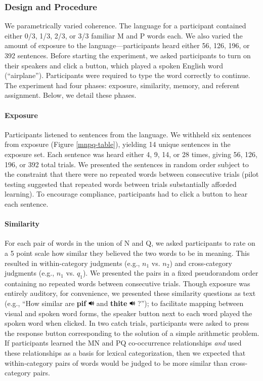 \documentclass[man,floatsintext]{apa6}
\begin{document}
\subsubsection{Design and Procedure}

We parametrically varied coherence. The language for a participant contained either 0/3, 1/3, 2/3, or 3/3 familiar M and P words each. We also varied the amount of exposure to the language---participants heard either 56, 126, 196, or 392 sentences. Before starting the experiment, we asked participants to turn on their speakers and click a button, which played a spoken English word (``airplane''). Participants were required to type the word correctly to continue. The experiment had four phases: exposure, similarity, memory, and referent assignment. Below, we detail these phases.

\paragraph{Exposure}
Participants listened to sentences from the language. We withheld six sentences from exposure (Figure \ref{mnpq-table}), yielding 14 unique sentences in the exposure set. Each sentence was heard either 4, 9, 14, or 28 times, giving 56, 126, 196, or 392 total trials. We presented the sentences in random order subject to the constraint that there were no repeated words between consecutive trials (pilot testing suggested that repeated words between trials substantially afforded learning). To encourage compliance, participants had to click a button to hear each sentence.

\paragraph{Similarity}
For each pair of words in the union of N and Q, we asked participants to rate on a 5 point scale how similar they believed the two words to be in meaning. This resulted in within-category judgments (e.g., $n_1$ vs. $n_2$) and cross-category judgments (e.g., $n_1$ vs. $q_1$). We presented the pairs in a fixed pseudorandom order containing no repeated words between consecutive trials. Though exposure was entirely auditory, for convenience, we presented these similarity questions as text (e.g., ``How similar are \textbf{pif} \includegraphics[width=0.3cm]{play.png} and \textbf{thite} \includegraphics[width=0.3cm]{play.png} ?''); to facilitate mapping between visual and spoken word forms, the speaker button next to each word played the spoken word when clicked. In two catch trials, participants were asked to press the response button corresponding to the solution of a simple arithmetic problem. If participants learned the MN and PQ co-occurrence relationships \emph{and} used these relationships as a basis for lexical categorization, then we expected that within-category pairs of words would be judged to be more similar than cross-category pairs.
\end{document}
